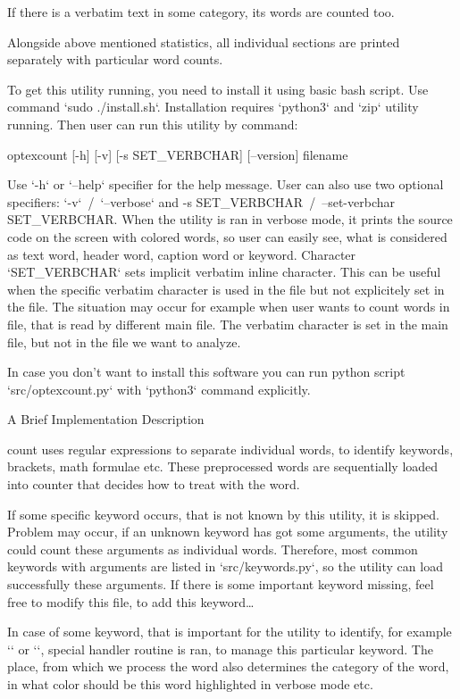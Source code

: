 If there is a verbatim text in some category, its words are counted too.

Alongside above mentioned statistics, all individual sections are printed separately with particular word counts.

To get this utility running, you need to install it using basic bash script.
Use command `sudo ./install.sh`.
Installation requires `python3` and `zip` utility running.
Then user can run this utility by command:

\begtt
optexcount [-h] [-v] [-s SET_VERBCHAR] [--version] filename
\endtt

Use {\Blue `-h`} or `--help` specifier for the help message.
User can also use two optional specifiers: {\Blue `-v`}~/~{\Blue `--verbose`} and {\Blue -s SET_VERBCHAR}~/~{\Blue --set-verbchar SET_VERBCHAR}.
When the utility is ran in verbose mode, it prints the source code on the screen with colored words, so user can easily see, what is considered as text word, header word, caption word or keyword.
Character {\Blue `SET_VERBCHAR`} sets implicit verbatim inline character.
This can be useful when the specific verbatim character is used in the file but not explicitely set in the file.
The situation may occur for example when user wants to count words in file, that is read by different main file.
The verbatim character is set in the main file, but not in the file we want to analyze.

In case you don't want to install this software you can run python script `src/optexcount.py` with `python3` command explicitly.

\sec A Brief Implementation Description

\OpTeX count uses regular expressions to separate individual words, to identify keywords, brackets, math formulae etc.
These preprocessed words are sequentially loaded into counter that decides how to treat with the word.

If some specific keyword occurs, that is not known by this utility, it is skipped.
Problem may occur, if an unknown keyword has got some arguments, the utility could count these arguments as individual words.
Therefore, most common keywords with arguments are listed in `src/keywords.py`, so the utility can load successfully these arguments.
If there is some important keyword missing, feel free to modify this file, to add this keyword\dots

In case of some keyword, that is important for the utility to identify, for example {\Blue `\sec`} or {\Blue `\fnote`}, special handler routine is ran, to manage this particular keyword.
The place, from which we process the word also determines the category of the word, in what color should be this word highlighted in verbose mode etc.


